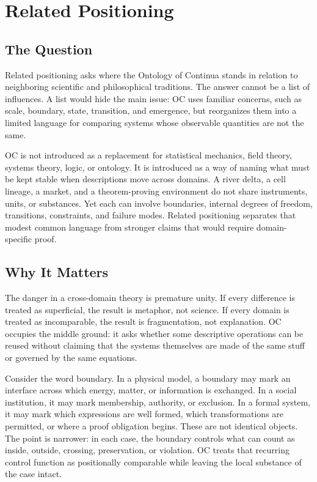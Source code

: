 \documentclass[11pt,a4paper,openany]{book}
\begin{document}
\section{Related Positioning}
\subsection{The Question}
Related positioning asks where the Ontology of Continua stands in relation to neighboring scientific and philosophical traditions. The answer cannot be a list of influences. A list would hide the main issue: OC uses familiar concerns, such as scale, boundary, state, transition, and emergence, but reorganizes them into a limited language for comparing systems whose observable quantities are not the same. \cite{goldenfeld_lectures,kadanoff_scaling}\par
OC is not introduced as a replacement for statistical mechanics, field theory, systems theory, logic, or ontology. It is introduced as a way of naming what must be kept stable when descriptions move across domains. A river delta, a cell lineage, a market, and a theorem-proving environment do not share instruments, units, or substances. Yet each can involve boundaries, internal degrees of freedom, transitions, constraints, and failure modes. Related positioning separates that modest common language from stronger claims that would require domain-specific proof.\par
\subsection{Why It Matters}
The danger in a cross-domain theory is premature unity. If every difference is treated as superficial, the result is metaphor, not science. If every domain is treated as incomparable, the result is fragmentation, not explanation. OC occupies the middle ground: it asks whether some descriptive operations can be reused without claiming that the systems themselves are made of the same stuff or governed by the same equations. \cite{goldenfeld_lectures,kadanoff_scaling}\par
Consider the word boundary. In a physical model, a boundary may mark an interface across which energy, matter, or information is exchanged. In a social institution, it may mark membership, authority, or exclusion. In a formal system, it may mark which expressions are well formed, which transformations are permitted, or where a proof obligation begins. These are not identical objects. The point is narrower: in each case, the boundary controls what can count as inside, outside, crossing, preservation, or violation. OC treats that recurring control function as positionally comparable while leaving the local substance of the case intact.\par
\end{document}
